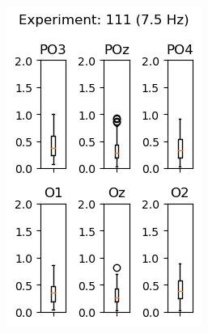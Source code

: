 \begin{figure}[ht]
\begin{subfigure}{0.25\linewidth}
        \includegraphics[width=\linewidth]{images/appendix/11175.png}
        \label{fig:11175}
    \end{subfigure}
        

\end{figure}
